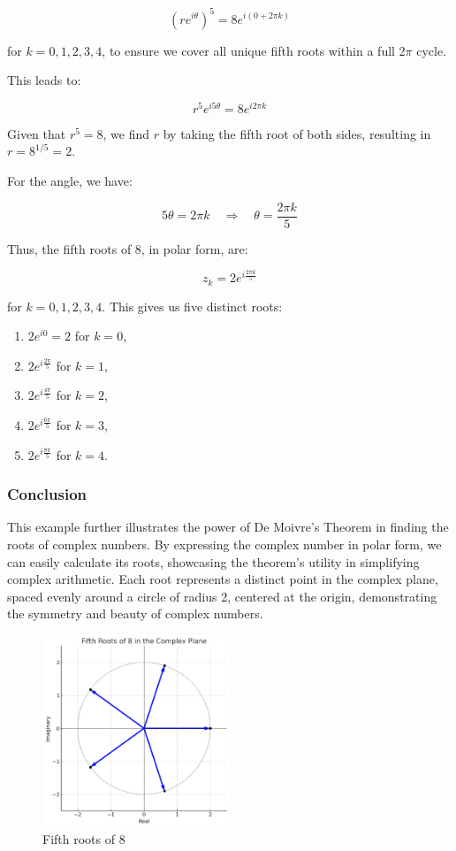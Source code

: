 \documentclass[
]{article}
\providecommand{\tightlist}{%
  \setlength{\itemsep}{0pt}\setlength{\parskip}{0pt}}
\def\tightlist{}
\begin{document}
\[
(re^{i\theta})^5 = 8e^{i(0 + 2\pi k)}
\]

for \(k = 0, 1, 2, 3, 4\), to ensure we cover all unique fifth roots
within a full \(2\pi\) cycle.

This leads to:

\[
r^5 e^{i5\theta} = 8e^{i2\pi k}
\]

Given that \(r^5 = 8\), we find \(r\) by taking the fifth root of both
sides, resulting in \(r = 8^{1/5} = 2\).

For the angle, we have:

\[
5\theta = 2\pi k \quad \Rightarrow \quad \theta = \frac{2\pi k}{5}
\]

Thus, the fifth roots of 8, in polar form, are:

\[
z_k = 2e^{i\frac{2\pi k}{5}}
\]

for \(k = 0, 1, 2, 3, 4\). This gives us five distinct roots:

\begin{enumerate}
\def\labelenumi{\arabic{enumi}.}
\tightlist
\item
  \(2e^{i0} = 2\) for \(k=0\),
\item
  \(2e^{i\frac{2\pi}{5}}\) for \(k=1\),
\item
  \(2e^{i\frac{4\pi}{5}}\) for \(k=2\),
\item
  \(2e^{i\frac{6\pi}{5}}\) for \(k=3\),
\item
  \(2e^{i\frac{8\pi}{5}}\) for \(k=4\).
\end{enumerate}

\subsubsection{Conclusion}\label{conclusion-3}

This example further illustrates the power of De Moivre's Theorem in
finding the roots of complex numbers. By expressing the complex number
in polar form, we can easily calculate its roots, showcasing the
theorem's utility in simplifying complex arithmetic. Each root
represents a distinct point in the complex plane, spaced evenly around a
circle of radius 2, centered at the origin, demonstrating the symmetry
and beauty of complex numbers.

\begin{figure}
\centering
\includegraphics[width=0.5\textwidth,height=\textheight]{eight.png}
\caption{Fifth roots of 8}
\end{figure}
\end{document}
